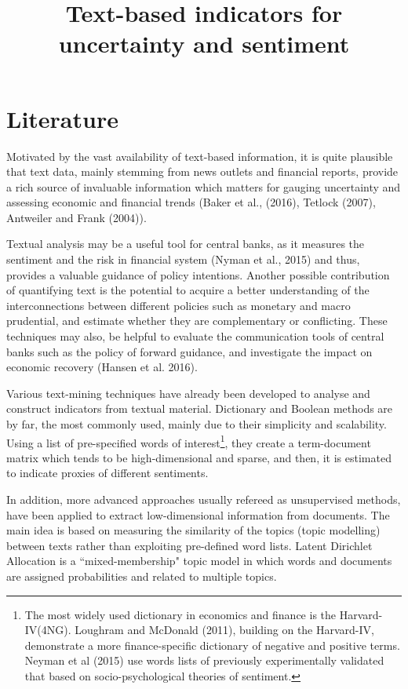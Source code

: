 \documentclass[12pt]{article}
\title{Text-based indicators for uncertainty and sentiment}
\begin{document}
\maketitle




\section{Literature}

Motivated by the vast availability of text-based information, it is quite plausible that text data, mainly stemming from news outlets and financial reports, provide a rich source of invaluable information which matters for gauging uncertainty and assessing economic and financial trends (Baker et al., (2016), Tetlock (2007), Antweiler and Frank (2004)).

Textual analysis may be a useful tool for central banks, as it measures the sentiment and the risk in financial system (Nyman et al., 2015) and thus, provides a valuable guidance of policy intentions.  Another possible contribution of quantifying text is the potential to acquire a better understanding of the interconnections between different policies such as monetary and macro prudential, and estimate whether they are complementary or conflicting. 
These techniques may also, be helpful to evaluate the communication tools of central banks such as the policy of forward guidance, and investigate the impact on economic recovery (Hansen et al. 2016).

Various text-mining techniques have already been developed to analyse and construct indicators from textual material. Dictionary and Boolean methods are by far, the most commonly used, mainly due to their simplicity and scalability. Using a list of pre-specified words of interest\footnote{The most widely used dictionary in economics and finance is the Harvard-IV(4NG). Loughram and McDonald (2011), building on the Harvard-IV, demonstrate a more finance-specific dictionary of negative and positive terms. Neyman et al (2015) use words lists of previously experimentally validated that based on socio-psychological theories of sentiment.}, they create a term-document matrix which tends to be high-dimensional and sparse, and then, it is estimated to indicate proxies of different sentiments.

In addition, more advanced approaches usually refereed as unsupervised methods, have been applied to extract low-dimensional information from documents. The main idea is based on measuring the similarity of the topics (topic modelling) between texts rather than exploiting pre-defined word lists. Latent Dirichlet Allocation is a ``mixed-membership"  topic model in which words and documents are assigned probabilities and related to multiple topics. 
\end{document}
